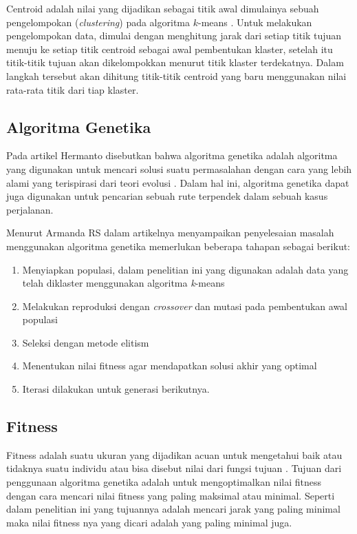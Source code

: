Centroid adalah nilai yang dijadikan sebagai titik awal dimulainya sebuah pengelompokan (\textit{clustering}) pada algoritma $k$-means \cite{retno2019peningkatan}. Untuk melakukan pengelompokan data, dimulai dengan menghitung jarak dari setiap titik tujuan menuju ke setiap titik centroid sebagai awal pembentukan klaster, setelah itu titik-titik tujuan akan dikelompokkan menurut titik klaster terdekatnya. Dalam langkah tersebut akan dihitung titik-titik centroid yang baru menggunakan nilai rata-rata titik dari tiap klaster.

\subsection{Algoritma Genetika}

Pada artikel Hermanto disebutkan bahwa algoritma genetika adalah algoritma yang digunakan untuk mencari solusi suatu permasalahan dengan cara yang lebih alami yang terispirasi dari teori evolusi  \cite{hermawanto2003algoritma}. Dalam hal ini, algoritma genetika dapat juga digunakan untuk pencarian sebuah rute terpendek dalam sebuah kasus perjalanan.

Menurut Armanda RS \cite{armanda2016penerapan} dalam artikelnya menyampaikan penyelesaian masalah menggunakan algoritma genetika memerlukan beberapa tahapan sebagai berikut:

\begin{enumerate}
	\item Menyiapkan populasi, dalam penelitian ini yang digunakan adalah data yang telah diklaster menggunakan algoritma \textit{k}-means
	\item Melakukan reproduksi dengan \textit{crossover} dan mutasi pada pembentukan awal populasi
	\item Seleksi dengan metode elitism
	\item Menentukan nilai fitness agar mendapatkan solusi akhir yang optimal
	\item Iterasi dilakukan untuk generasi berikutnya.
\end{enumerate}

\subsection{Fitness}
Fitness adalah suatu ukuran yang dijadikan acuan untuk mengetahui baik atau tidaknya suatu individu atau bisa disebut nilai dari fungsi tujuan \cite{basuki2003strategi}. Tujuan dari penggunaan algoritma genetika adalah untuk mengoptimalkan nilai fitness dengan cara mencari nilai fitness yang paling maksimal atau minimal. Seperti dalam penelitian ini yang tujuannya adalah mencari jarak yang paling minimal maka nilai fitness nya yang dicari adalah yang paling minimal juga.

